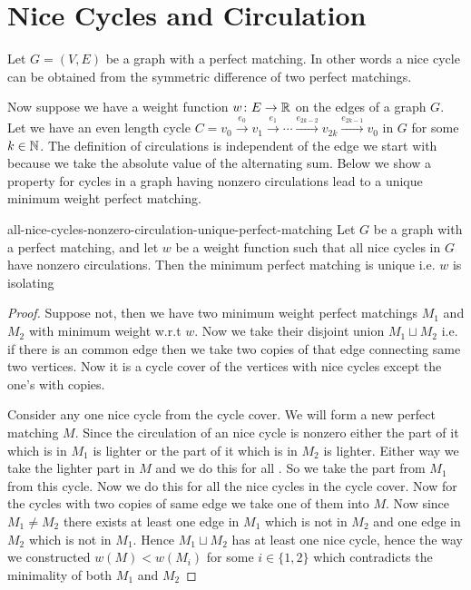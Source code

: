 \section{Nice Cycles and Circulation}
Let $G=(V,E)$ be a graph with a perfect matching. 
\parinf In other words a nice cycle can be obtained from the symmetric difference of two perfect matchings.\parinn

Now suppose we have a weight function $w\colon E\to \mathbb{R}$ on the edges of a graph $G$. Let we have an even length cycle $C=v_0\overset{e_0}{\longrightarrow}v_1\overset{e_1}{\longrightarrow}\cdots \overset{e_{2k-2}}{\longrightarrow}v_{2k}\overset{e_{2k-1}}{\longrightarrow}v_0$ in $G$ for some $k\in \mathbb{N}$.
The definition of circulations is independent of the edge we start with because we take the absolute value of the alternating sum. Below we show a property for cycles in a graph having nonzero circulations lead to a unique minimum weight perfect matching.

\begin{lemma}{\cite[Lemma 3.2]{DattaKulkarniRoy_2009_DIa}}{all-nice-cycles-nonzero-circulation-unique-perfect-matching}
	Let $G$ be a graph with a perfect matching, and let $w$ be a weight function such that all nice cycles in $G$ have nonzero circulations. Then the minimum perfect matching is unique i.e. $w$ is isolating
\end{lemma}
\begin{proof}
	Suppose  not, then we have two minimum weight perfect matchings $M_1$ and $M_2$ with minimum weight w.r.t $w$. Now we take their disjoint union $M_1\sqcup M_2$ i.e. if there is an common edge then we take two copies of that edge connecting same two vertices. Now it is a cycle cover of the vertices with nice cycles except the one's with copies. 
	
	Consider any one nice cycle from the cycle cover. We will form a new perfect matching $M$. Since the circulation of an nice cycle is nonzero either the part of it which is in
	$M_1$ is lighter or the part of it which is in $M_2$ is lighter. Either way we take the lighter part in $M$ and we do this for all . So we take the part from $M_1$ from this cycle. Now we do this for all the nice cycles in the cycle cover. Now for the cycles with two copies of same edge we take one of them into $M$. Now since $M_1\neq M_2$ there exists at least one edge in $M_1$ which is not in $M_2$ and one edge in $M_2$ which is not in $M_1$. Hence $M_1\sqcup M_2$ has at least one nice cycle, hence the way we constructed $w(M)<w(M_i)$ for some $i\in \{1,2\}$ which contradicts the minimality of both $M_1$ and $M_2$
\end{proof}


